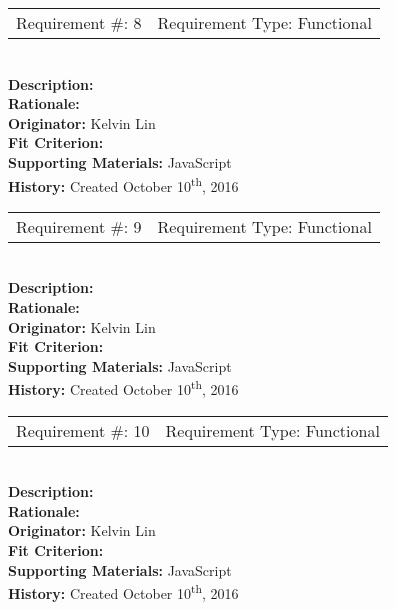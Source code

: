 \documentclass[12pt, titlepage]{article}
\begin{document}
\begin{reqbox}
%
\begin{tabular}{cc}
Requirement \#: 8 & Requirement Type: Functional \\
\end{tabular} \\
%
\textbf{Description:}  \\
\textbf{Rationale:}  \\
\textbf{Originator:} Kelvin Lin\\
\textbf{Fit Criterion:} \\
%  
\textbf{Supporting Materials:} JavaScript \\
\textbf{History:} Created October 10\textsuperscript{th}, 2016
%
\end{reqbox}

\newpage

\begin{reqbox}
%
\begin{tabular}{cc}
Requirement \#: 9 & Requirement Type: Functional \\
\end{tabular} \\
%
\textbf{Description:}  \\
\textbf{Rationale:}  \\
\textbf{Originator:} Kelvin Lin\\
\textbf{Fit Criterion:} \\
%  
\textbf{Supporting Materials:} JavaScript \\
\textbf{History:} Created October 10\textsuperscript{th}, 2016
%
\end{reqbox}

\begin{reqbox}
%
\begin{tabular}{cc}
Requirement \#: 10 & Requirement Type: Functional \\
\end{tabular} \\
%
\textbf{Description:}  \\
\textbf{Rationale:}  \\
\textbf{Originator:} Kelvin Lin\\
\textbf{Fit Criterion:} \\
%  
\textbf{Supporting Materials:} JavaScript \\
\textbf{History:} Created October 10\textsuperscript{th}, 2016
%
\end{reqbox}

\newpage
\end{document}
